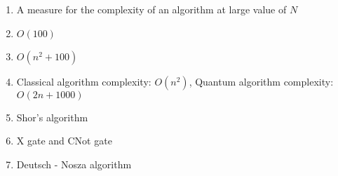 \documentclass[a4paper]{article}
\begin{document}
    \begin{enumerate}[1.]
        \item A measure for the complexity of an algorithm at large value of $N$
        \item $O(100)$
        \item $O(n^{2}+100)$
        \item Classical algorithm complexity: $O(n^2)$, Quantum algorithm complexity: $O(2n+1000)$
        \item Shor's algorithm
        \item X gate and CNot gate
        \item Deutsch - Nosza algorithm
    \end{enumerate}
\end{document}
